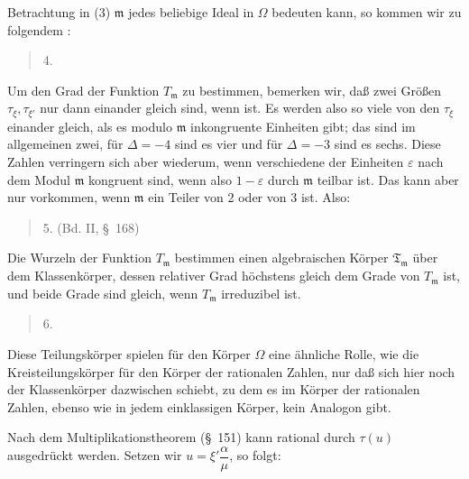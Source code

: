 Betrachtung in (3) $\mathfrak{m}$ jedes beliebige Ideal in $\Omega$ bedeuten kann, so kommen wir zu folgendem :

\begin{quote}
4. 
\end{quote}

Um den Grad der Funktion $T_{\mathfrak m}$ zu bestimmen, bemerken wir, daß zwei Größen $\tau_\xi, \tau_{\xi'}$ nur dann einander gleich sind, wenn
ist. Es werden also so viele von den $\tau_\xi$ einander gleich, als es modulo $\mathfrak{m}$ inkongruente Einheiten gibt; das sind im allgemeinen zwei, für $\Delta = -4$ sind es vier und für $\Delta = -3$ sind es sechs. Diese Zahlen verringern sich aber wiederum, wenn verschiedene der Einheiten $\varepsilon$ nach dem Modul $\mathfrak{m}$ kongruent sind, wenn also $1 - \varepsilon$ durch $\mathfrak{m}$ teilbar ist. Das kann aber nur vorkommen, wenn $\mathfrak{m}$ ein Teiler von 2 oder von 3 ist. Also:

\begin{quote}
5.  (Bd. II, \S\ 168) 
\end{quote}

Die Wurzeln der Funktion $T_{\mathfrak m}$ bestimmen einen algebraischen Körper $\mathfrak{T}_{\mathfrak m}$ über dem Klassenkörper, dessen relativer Grad höchstens gleich dem Grade von $T_{\mathfrak m}$ ist, und beide Grade sind gleich, wenn $T_{\mathfrak m}$ irreduzibel ist.

\begin{quote}
6. 
\end{quote}

Diese Teilungskörper spielen für den Körper $\Omega$ eine ähnliche Rolle, wie die Kreisteilungskörper für den Körper der rationalen Zahlen, nur daß sich hier noch der Klassenkörper dazwischen schiebt, zu dem es im Körper der rationalen Zahlen, ebenso wie in jedem einklassigen Körper, kein Analogon gibt.

Nach dem Multiplikationstheorem (\S\ 151) kann
rational durch $\tau(u)$ ausgedrückt werden. Setzen wir $u = \xi'\dfrac{\alpha}{\mu}$, so folgt:
